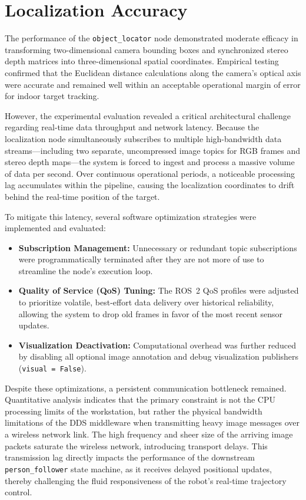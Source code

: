 \section{Localization Accuracy}
The performance of the \texttt{object\_locator} node demonstrated moderate efficacy in transforming two-dimensional camera bounding boxes and synchronized stereo depth matrices into three-dimensional spatial coordinates. Empirical testing confirmed that the Euclidean distance calculations along the camera's optical axis were accurate and remained well within an acceptable operational margin of error for indoor target tracking. 

However, the experimental evaluation revealed a critical architectural challenge regarding real-time data throughput and network latency. Because the localization node simultaneously subscribes to multiple high-bandwidth data streams—including two separate, uncompressed image topics for RGB frames and stereo depth maps—the system is forced to ingest and process a massive volume of data per second. Over continuous operational periods, a noticeable processing lag accumulates within the pipeline, causing the localization coordinates to drift behind the real-time position of the target.

To mitigate this latency, several software optimization strategies were implemented and evaluated:
\begin{itemize}
	\item \textbf{Subscription Management:} Unnecessary or redundant topic subscriptions were programmatically terminated after they are not more of use to streamline the node's execution loop.
	\item \textbf{Quality of Service (QoS) Tuning:} The ROS~2 QoS profiles were adjusted to prioritize volatile, best-effort data delivery over historical reliability, allowing the system to drop old frames in favor of the most recent sensor updates.
	\item \textbf{Visualization Deactivation:} Computational overhead was further reduced by disabling all optional image annotation and debug visualization publishers (\texttt{visual = False}).
\end{itemize}

Despite these optimizations, a persistent communication bottleneck remained. Quantitative analysis indicates that the primary constraint is not the CPU processing limits of the workstation, but rather the physical bandwidth limitations of the DDS middleware when transmitting heavy image messages over a wireless network link. The high frequency and sheer size of the arriving image packets saturate the wireless network, introducing transport delays. This transmission lag directly impacts the performance of the downstream \texttt{person\_follower} state machine, as it receives delayed positional updates, thereby challenging the fluid responsiveness of the robot's real-time trajectory control.

